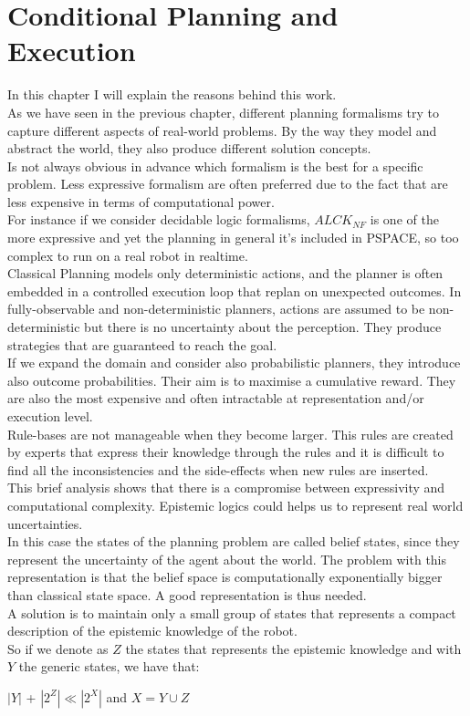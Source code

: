 \documentclass[pdftex,12pt,a4paper]{report}
\begin{document}
\chapter{Conditional Planning and Execution}\label{sec:approach}
In this chapter I will explain the reasons behind this work.\\
\newline
\noindent As we have seen in the previous chapter, different planning formalisms try to capture different aspects of real-world problems. By the way they model and abstract the world, they also produce different solution concepts.\\
Is not always obvious in advance which formalism is the best for a specific problem. Less expressive formalism are often preferred due to the fact that are less expensive in terms of computational power.\\
For instance if we consider decidable logic formalisms, $ALCK_{NF}$ is one of the more expressive and yet the planning in general it's included in PSPACE, so too complex to run on a real robot in realtime.\\ 
Classical Planning models only deterministic actions, and the planner is often embedded in a controlled execution loop that replan on unexpected outcomes. In fully-observable and non-deterministic planners, actions are assumed to be non-deterministic but there is no uncertainty about the perception. They produce strategies that are guaranteed to reach the goal. \\
If we expand the domain and consider also probabilistic planners, they introduce also outcome probabilities. Their aim is to maximise a cumulative reward. They are also the most expensive and often intractable at representation and/or execution level. \\
Rule-bases are not manageable when they become larger. This rules are created by experts that express their knowledge through the rules and it is difficult to find all the inconsistencies and the side-effects when new rules are inserted.\\


\noindent This brief analysis shows that there is a compromise between expressivity and computational complexity. 
Epistemic logics could helps us to represent real world uncertainties.\\
In this case the states of the planning problem are called belief states, since they represent the uncertainty of the agent about the world.
The problem with this representation is that the belief space is computationally exponentially bigger than classical state space. A good representation is thus needed.\\
A solution is to maintain only a small group of states that represents a compact description of the epistemic knowledge of the robot.\\
So if we denote as $Z$ the states that represents the epistemic knowledge and with $Y$ the generic states, we have that:
\begin{center}
$|Y|$ + $|2^Z| \ll |2^X|$ and $X = Y \cup Z$
\end{center}
\end{document}
